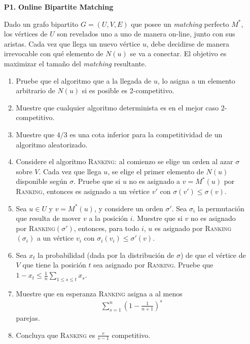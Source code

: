 \documentclass[11pt, spanish]{article}
\theoremstyle{plain}
\begin{document}
\begin{itemize}
  \item[\textbf{P1.}] \textbf{Online Bipartite Matching}

    Dado un grafo bipartito $G=(U,V,E)$ que posee un \textit{matching} perfecto $M^*$,
    los v\'ertices de $U$ son revelados
    uno a uno de manera on-line, junto con sus aristas. Cada vez que llega un
    nuevo v\'ertice $u$, debe decidirse de manera irrevocable con qu\'e
    elemento de $N(u)$ se va a conectar. El objetivo es maximizar el tamaño
    del \textit{matching} resultante.
    \begin{enumerate}
      \item Pruebe que el algoritmo que a la llegada de $u$, lo asigna a un
	elemento arbitrario de $N(u)$ si es posible es 2-competitivo.
      \item Muestre que cualquier algoritmo determinista es en el mejor
	caso 2-competitivo.

      \item Muestre que $4/3$ es una cota inferior para la competitividad
	de un algoritmo aleatorizado.

      \item Considere el algoritmo \textsc{Ranking}: al comienzo se elige un orden al
	azar $\sigma$ sobre $V$. Cada vez que llega $u$, se elige el primer
	elemento de $N(u)$ disponible según $\sigma$. Pruebe que si $u$ no
	es asignado a $v=M^*(u)$ por \textsc{Ranking}, entonces es asignado a
	un v\'ertice $v'$ con $\sigma(v') \leq \sigma(v)$.

      \item Sea $u\in U$ y $v= M^*(u)$, y considere un orden $\sigma'$. Sea
	$\sigma_i$ la permutación que resulta de mover $v$ a la posición $i$.
	Muestre que si $v$ no es asignado por \textsc{Ranking}$(\sigma')$, entonces,
	para todo $i$, $u$ es asignado por \textsc{Ranking}$(\sigma_i)$ a un
	v\'ertice $v_i$ con $\sigma_i(v_i) \leq \sigma'(v)$.

      \item Sea $x_t$ la probabilidad (dada por la distribución de $\sigma$) de que
	el v\'ertice de $V$ que tiene la posición $t$ sea asignado por
	\textsc{Ranking}. Pruebe que $1-x_t \leq \frac{1}{n} \sum_{1\leq s\leq t} x_s$.

      \item Muestre que en esperanza \textsc{Ranking} asigna a al menos 
	\begin{align*}
	  \sum_{s=1}^n \left( 1- \frac{1}{n+1} \right)^s
	\end{align*}
	parejas.

      \item Concluya que \textsc{Ranking} es $\frac{e}{e-1}$ competitivo.
    \end{enumerate}

\end{itemize}
\end{document}

